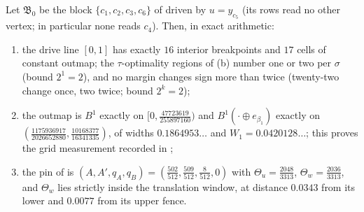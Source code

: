 \begin{proposition}\label{rs:b2-window}
Let $\mathfrak B_0$ be the block $\{c_1,c_2,c_3,c_6\}$ of
 driven by $u=y_{c_5}$ (its rows read no other vertex;
in particular none reads $c_4$). Then, in exact arithmetic:
\begin{enumerate}[label=(\alph*),leftmargin=2.2em]
\item the drive line $[0,1]$ has exactly $16$ interior breakpoints and $17$
      cells of constant outmap; the $\tau$-optimality regions of
      (b) number one or two per $\sigma$ (bound $2^{1}=2$), and
      no margin changes sign more than twice (twenty-two change once, two
      twice; bound $2^{k}=2$);
\item the outmap is $B^{1}$ exactly on $[0,\tfrac{47723619}{255897160})$ and
      $B^{1}(\cdot\oplus e_{\beta_1})$ exactly on
      $(\tfrac{1175936917}{2026652880},\tfrac{10168377}{16341335})$, of widths
      $0.1864953\ldots$ and $W_1=0.0420128\ldots$; this proves the grid
      measurement recorded in ;
\item the pin of  is
      $(A,A',q_A,q_B)=(\tfrac{502}{512},\tfrac{509}{512},\tfrac8{512},0)$ with
      $\Theta_u=\tfrac{2048}{3313}$, $\Theta_w=\tfrac{2036}{3313}$, and
      $\Theta_w$ lies strictly inside the translation window, at distance
      $0.0343$ from its lower and $0.0077$ from its upper fence.
\end{enumerate}
\end{proposition}

